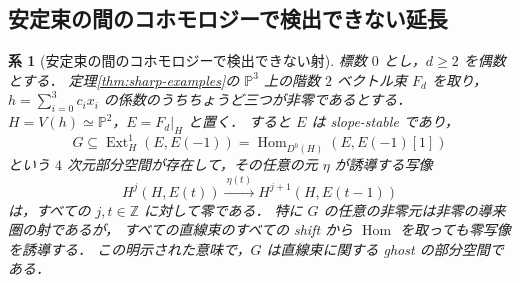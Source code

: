 \documentclass[a4paper,11pt]{ltjsarticle}
\numberwithin{equation}{section}
\theoremstyle{plain}
\newtheorem{corollary}[theorem]{系}
\theoremstyle{definition}
\theoremstyle{remark}
\begin{document}
\subsection{安定束の間のコホモロジーで検出できない延長}

\begin{corollary}[安定束の間のコホモロジーで検出できない射]
\label{cor:stable-four-dimensional-ghosts}
標数 $0$ とし，$d\geq2$ を偶数とする．
定理\ref{thm:sharp-examples}の $\mathbb P^3$ 上の階数 $2$ ベクトル束 $F_d$ を取り，
$h=\sum_{i=0}^3c_ix_i$ の係数のうちちょうど三つが非零であるとする．
$H=V(h)\simeq\mathbb P^2$，$E=F_d|_H$ と置く．
すると $E$ は slope-stable であり，
\[
 G\subseteq\operatorname{Ext}^1_H(E,E(-1))
   =\operatorname{Hom}_{D^b(H)}(E,E(-1)[1])
\]
という $4$ 次元部分空間が存在して，その任意の元 $\eta$ が誘導する写像
\[
 H^j(H,E(t))\xrightarrow{\ \eta(t)\ }
 H^{j+1}(H,E(t-1))
\]
は，すべての $j,t\in\mathbb Z$ に対して零である．
特に $G$ の任意の非零元は非零の導来圏の射であるが，
すべての直線束のすべての shift から $\operatorname{Hom}$ を取っても零写像を誘導する．
この明示された意味で，$G$ は直線束に関する ghost の部分空間である．
\end{corollary}
\end{document}
